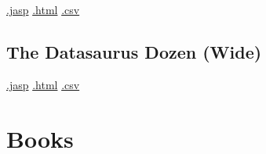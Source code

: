 \documentclass[
  letterpaper,
  DIV=11,
  numbers=noendperiod]{scrreprt}
\begin{document}
\textbar{}
\href{https://github.com/jasp-stats/jasp-data-library/raw/main/The\%20Datasaurus\%20Dozen\%20(Long)/The\%20Datasaurus\%20Dozen\%20(Long).jasp}{.jasp}
\textbar{}
\href{https://htmlpreview.github.io/?https://github.com/jasp-stats/jasp-data-library/blob/main/The\%20Datasaurus\%20Dozen\%20(Long)/index.html}{.html}
\textbar{}
\href{https://raw.githubusercontent.com/jasp-stats/jasp-data-library/main/The\%20Datasaurus\%20Dozen\%20(Long)/The\%20Datasaurus\%20Dozen\%20(Long).csv}{.csv}

\hypertarget{the-datasaurus-dozen-wide}{%
\section{The Datasaurus Dozen (Wide)}\label{the-datasaurus-dozen-wide}}

\textbar{}
\href{https://github.com/jasp-stats/jasp-data-library/raw/main/The\%20Datasaurus\%20Dozen\%20(Wide)/The\%20Datasaurus\%20Dozen\%20(Wide).jasp}{.jasp}
\textbar{}
\href{https://htmlpreview.github.io/?https://github.com/jasp-stats/jasp-data-library/blob/main/The\%20Datasaurus\%20Dozen\%20(Wide)/index.html}{.html}
\textbar{}
\href{https://raw.githubusercontent.com/jasp-stats/jasp-data-library/main/The\%20Datasaurus\%20Dozen\%20(Wide)/The\%20Datasaurus\%20Dozen\%20(Wide).csv}{.csv}


\hypertarget{books}{%
\chapter{Books}\label{books}}
\end{document}
